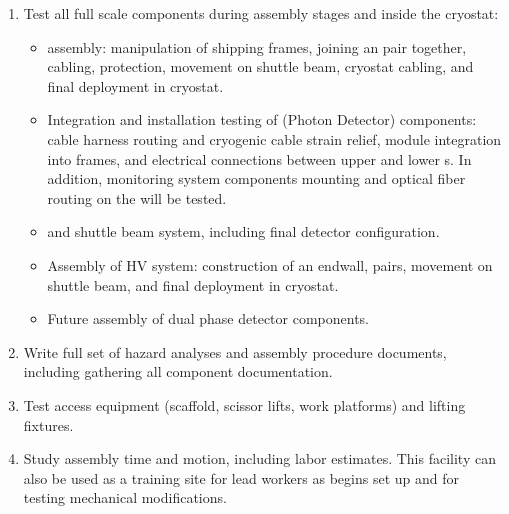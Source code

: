 \begin{enumerate}
\item Test all full scale  components during assembly stages and inside the cryostat:  
\begin{itemize}
    \item {}  assembly: manipulation of  shipping frames, joining an  pair together,  cabling,  protection, movement on shuttle beam, cryostat cabling, and final deployment in cryostat. 
    \item Integration and installation testing of  (Photon Detector) components: cable harness routing and cryogenic cable strain relief, module integration into  frames, and electrical connections between upper and lower s.  In addition,  monitoring system components mounting and optical fiber routing on the  will be tested.
    \item {} and shuttle beam system, including final detector configuration.
    \item Assembly of HV system: construction of an endwall,  pairs, movement on shuttle beam, and final deployment in cryostat.
    \item Future assembly of dual phase detector components.
\end{itemize}
\item Write full set of hazard analyses and assembly procedure documents, including gathering all component documentation. 
\item Test access equipment (scaffold, scissor lifts, work platforms) and lifting fixtures. 
\item Study assembly time and motion, including labor estimates. This facility can also be used as a training site for lead workers as  begins set up and for testing mechanical modifications.
\end{enumerate}

